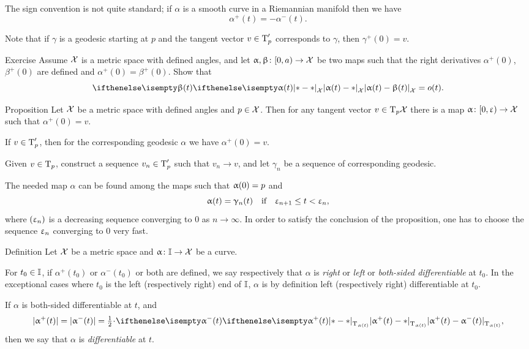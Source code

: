 The sign convention is not quite standard; if $\alpha$ is a smooth curve in a Riemannian manifold then we have
\[\alpha^+(t)=-\alpha^-(t).\]

Note that if $\gamma$ is a geodesic starting at $p$ 
and the tangent vector $v\in\T_p'$ corresponds to $\gamma$, 
then $\gamma^+(0)=v$.

\begin{thm}{Exercise}\label{ex:tangent-vect=o(t)}
Assume $\mathcal{X}$ is a metric space with defined angles,
and let $\alpha,\beta\:[0,a)\to\spc{X}$ 
be two maps such that the right derivatives $\alpha^+(0)$, $\beta^+(0)$ are defined and $\alpha^+(0)=\beta^+(0)$.
Show that
\[\dist{\alpha(t)}{\beta(t)}{\spc{X}}=o(t).\]
\end{thm}

\begin{thm}{Proposition}
Let $\mathcal{X}$ be a metric space with defined angles and $p\in \spc{X}$.
Then for any tangent vector $v\in\T_p\spc{X}$ there is a map $\alpha\:[0,\eps)\to \spc{X}$ such that $\alpha^+(0)=v$.
\end{thm}

If $v\in \T_p'$, then for the corresponding geodesic $\alpha$ we have $\alpha^+(0)=v$.

Given $v\in \T_p$, construct a sequence $v_n\in\T'_p$ 
such that $v_n\to v$, and let $\gamma_n$ be a sequence of corresponding geodesic.

The needed map $\alpha$ can be found among the maps such that $\alpha(0)\z=p$ and
\[\alpha(t)=\gamma_n(t)\quad \text{if}\quad \eps_{n+1}\le t<\eps_n,\]
where $(\upvarepsilon_n)$
is a decreasing sequence converging to $0$ as $n\to\infty$.
In order to satisfy the conclusion of the proposition, one has to choose the sequence $\upvarepsilon_n$ converging to $0$ very fast.
\qeds

\begin{thm}{Definition}\label{def:diff-curv}
Let 
$\mathcal{X}$ be a metric space 
and $\alpha\:\II\to \spc{X}$ be a curve.

For $t_0\in\II$, 
if $\alpha^+(t_0)$ or $\alpha^-(t_0)$ or both are defined,
we say respectively that $\alpha$ is \emph{right} or \emph{left} or \emph{both-sided differentiable} at $t_0$.
In the exceptional cases where $t_0$ is the left (respectively right) end of $\mathbb{I}$, $\alpha$ is by definition left (respectively right) differentiable at $t_0$.

If $\alpha$ is both-sided differentiable at $t$, and 
\[|\alpha^+(t)|=|\alpha^-(t)|=\tfrac12\cdot\dist{\alpha^+(t)}{\alpha^-(t)}{\T_{\alpha(t)}},\] then we say that $\alpha$ is \emph{differentiable} at $t$.
\end{thm}

